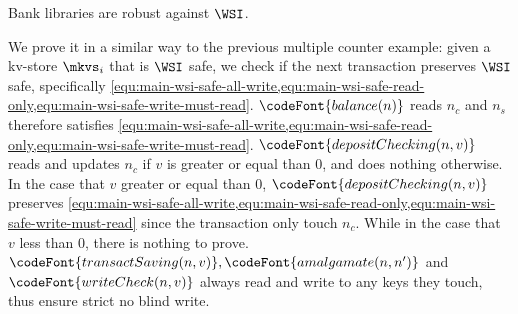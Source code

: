 \begin{theorem}
    Bank libraries  are robust against \( \WSI \).
\end{theorem}

\noindent We prove it in a similar way to the previous multiple counter example: given a kv-store \( \mkvs_i \) that is \( \WSI \) safe,
we check if the next transaction preserves \( \WSI \) safe, 
specifically \cref{equ:main-wsi-safe-all-write,equ:main-wsi-safe-read-only,equ:main-wsi-safe-write-must-read}.
\(\codeFont{balance(n)} \) reads \( n_c \) and \( n_s \) therefore satisfies \cref{equ:main-wsi-safe-all-write,equ:main-wsi-safe-read-only,equ:main-wsi-safe-write-must-read}.
\(\codeFont{depositChecking(n,v)} \) reads and updates \( n_c \) if \( v \) is greater or equal than 0, and does nothing otherwise.
In the case that \( v \) greater or equal than 0,  \(\codeFont{depositChecking(n,v)} \) preserves  
\cref{equ:main-wsi-safe-all-write,equ:main-wsi-safe-read-only,equ:main-wsi-safe-write-must-read} since
the transaction only touch \( n_c \).
While in the case that \( v \) less than 0, there is nothing to prove.
\( \codeFont{transactSaving(n,v)}, \codeFont{amalgamate(n,n')} \) and \( \codeFont{writeCheck(n,v)}\)
always read and write to any keys they touch, thus ensure strict no blind write.

